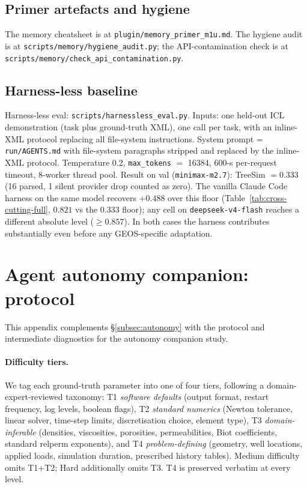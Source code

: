 \documentclass{article}
\begin{document}
\subsection{Primer artefacts and hygiene}
The memory cheatsheet is at \texttt{plugin/memory\_primer\_m1u.md}. The hygiene audit is at \texttt{scripts/memory/hygiene\_audit.py}; the API-contamination check is at \texttt{scripts/memory/check\_api\_contamination.py}.

\subsection{Harness-less baseline}
\label{subsec:harnessless}
Harness-less eval: \texttt{scripts/harnessless\_eval.py}. Inputs: one held-out ICL demonstration (task plus ground-truth XML), one call per task, with an inline-XML protocol replacing all file-system instructions. System prompt = \texttt{run/AGENTS.md} with file-system paragraphs stripped and replaced by the inline-XML protocol. Temperature 0.2, \texttt{max\_tokens} $=$ 16384, 600-s per-request timeout, 8-worker thread pool. Result on val (\texttt{minimax-m2.7}): TreeSim $= 0.333$ (16 parsed, 1 silent provider drop counted as zero). The vanilla Claude Code harness on the same model recovers ${+}0.488$ over this floor (Table~\ref{tab:cross-cutting-full}, $0.821$ vs the $0.333$ floor); any cell on \texttt{deepseek-v4-flash} reaches a different absolute level ($\geq 0.857$). In both cases the harness contributes substantially even before any GEOS-specific adaptation.

\section{Agent autonomy companion: protocol}
\label{app:autonomy}

This appendix complements \S\ref{subsec:autonomy} with the protocol and intermediate diagnostics for the autonomy companion study.

\paragraph{Difficulty tiers.} We tag each ground-truth parameter into one of four tiers, following a domain-expert-reviewed taxonomy: T1 \emph{software defaults} (output format, restart frequency, log levels, boolean flags), T2 \emph{standard numerics} (Newton tolerance, linear solver, time-step limits, discretisation choice, element type), T3 \emph{domain-inferable} (densities, viscosities, porosities, permeabilities, Biot coefficients, standard relperm exponents), and T4 \emph{problem-defining} (geometry, well locations, applied loads, simulation duration, prescribed history tables). Medium difficulty omits T1+T2; Hard additionally omits T3. T4 is preserved verbatim at every level.
\end{document}
